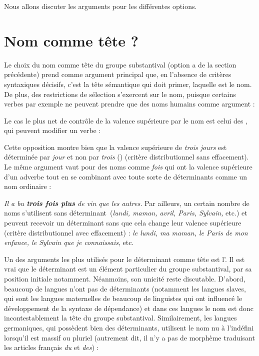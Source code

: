 Nous allons discuter les arguments pour les différentes options.

\section{Nom comme tête ?}\label{sec:3.3.24}

Le choix du nom comme tête du groupe substantival (option a de la section précédente) prend comme argument principal que, en l’absence de critères syntaxiques décisifs, c’est la tête sémantique qui doit primer, laquelle est le nom. De plus, des restrictions de sélection s’exercent sur le nom, puisque certains verbes par exemple ne peuvent prendre que des noms humains comme argument :

\ea
{}
\z
\z
Le cas le plus net de contrôle de la valence supérieure par le nom est celui des , qui peuvent modifier un verbe :

\ea
  \z
\z
Cette opposition montre bien que la valence supérieure de \textit{trois jours} est déterminée par \textit{jour} et non par \textit{trois} (\citealt{langendonck1994determiners}) (critère distributionnel sans effacement). Le même argument vaut pour des noms comme \textit{fois} qui ont la valence supérieure d’un adverbe tout en se combinant avec toute sorte de déterminants comme un nom ordinaire :

\ea
    \textit{{Il a bu} \textbf{{trois fois plus}} {de vin que les autres}.}
\z
Par ailleurs, un certain nombre de noms s’utilisent sans déterminant~(\textit{lundi, maman, avril, Paris, Sylvain,} etc.) et peuvent recevoir un déterminant sans que cela change leur valence supérieure~ (critère distributionnel avec effacement) : \textit{le lundi, ma maman, le Paris de mon enfance, le Sylvain que je connaissais}, etc.

Un des arguments les plus utilisés pour le déterminant comme tête est l’. Il est vrai que le déterminant est un élément particulier du groupe substantival, par sa position initiale notamment. Néanmoins, son unicité reste discutable. D’abord, beaucoup de langues n’ont pas de déterminants (notamment les langues slaves, qui sont les langues maternelles de beaucoup de linguistes qui ont influencé le développement de la syntaxe de dépendance) et dans ces langues le nom est donc incontestablement la tête du groupe substantival. Similairement, les langues germaniques, qui possèdent bien des déterminants, utilisent le nom nu à l’indéfini lorsqu’il est massif ou pluriel (autrement dit, il n’y a pas de morphème traduisant les articles français \textit{du} et \textit{des}) :

